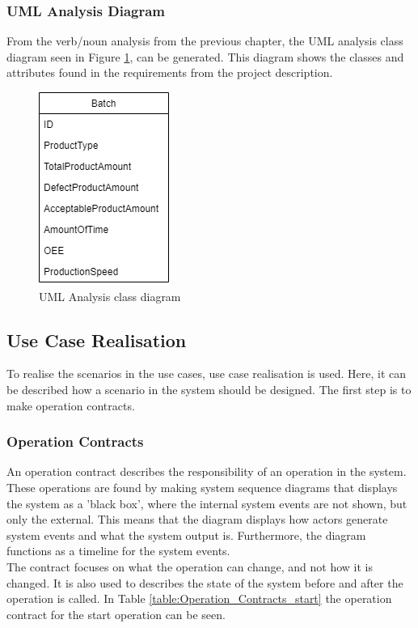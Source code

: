 \subsubsection{UML Analysis Diagram}
From the verb/noun analysis from the previous chapter, the UML analysis class
diagram seen in Figure \ref{figure:analysis_diagram}, can be generated. This
diagram shows the classes and attributes found in the requirements from the
project description.

\begin{figure}[ht]
	\centering 
	\includegraphics[scale=0.6]{images/diagrams/UML_Analysis_Diagram.drawio.png}
	\caption{UML Analysis class diagram}
	\label{figure:analysis_diagram} 
\end{figure}

\subsection{Use Case Realisation}
To realise the scenarios in the use cases, use case realisation is used. Here,
it can be described how a scenario in the system should be designed. The first
step is to make operation contracts.

\subsubsection{Operation Contracts}
An operation contract describes the responsibility of an operation in the system.
These operations are found by making system sequence diagrams that displays the
system as a 'black box', where the internal system events are not shown, but
only the external. This means that the diagram displays how actors generate
system events and what the system output is. Furthermore, the diagram functions
as a timeline for the system events. \\

The contract focuses on what the operation can change, and not how it is changed. 
It is also used to describes the state of the system before and after the 
operation is called. In Table \ref{table:Operation_Contracts_start} the
operation contract for the start operation can be seen.

